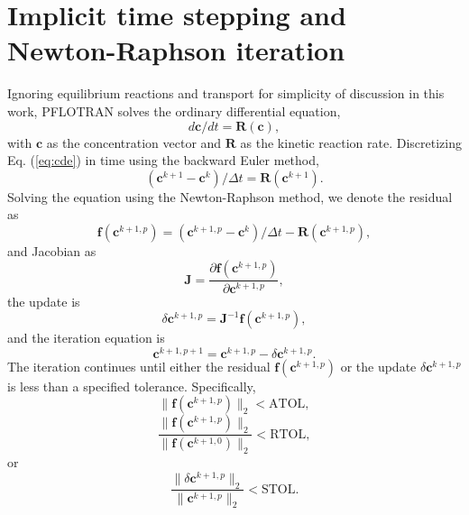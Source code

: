 \documentclass[gmd, manuscript]{copernicus}
\begin{document}
\section{Implicit time stepping and Newton-Raphson iteration}
\label{sec:newton}
Ignoring equilibrium reactions and transport for simplicity of discussion in
this work, PFLOTRAN solves the ordinary differential equation,
\begin{equation}
\label{eq:cde}
{d \mathbf{c}}/{d t} = \mathbf{R}(\mathbf{c}),
\end{equation}
with $\mathbf{c}$ as the concentration vector and $\mathbf{R}$ as the kinetic reaction rate. 
Discretizing Eq. (\ref{eq:cde}) in time using the backward Euler method, 
\begin{equation}
{(\mathbf{c}^{k+1} - \mathbf{c}^k)}/{\Delta t} = \mathbf{R}(\mathbf{c}^{k+1}).
\label{eq:cdedis}
\end{equation}
Solving the equation  using the Newton-Raphson method, we denote the residual as
\begin{equation}
\mathbf{f}(\mathbf{c}^{k+1,p} )=(\mathbf{c}^{k+1,p}-\mathbf{c}^k)/\Delta t-\mathbf{R}(\mathbf{c}^{k+1,p}),
\label{eq:residual}
\end{equation}
and Jacobian as
\begin{equation}
\mathbf{J} = \frac{\partial \mathbf{f}(\mathbf{c}^{k+1,p})}{\partial \mathbf{c}^{k+1,p}},
\label{eq:jacobian}
\end{equation}
the update is
\begin{equation}
\delta \mathbf{c}^{k+1,p}= \mathbf{J}^{-1} \mathbf{f} (\mathbf{c}^{k+1,p}),
\label{eq:axb}
\end{equation}
and the iteration equation is
\begin{equation}
\mathbf{c}^{k+1,p+1}=\mathbf{c}^{k+1,p}-\delta \mathbf{c}^{k+1,p}.
\label{eq:update}
\end{equation}
The iteration continues until either the residual
$\mathbf{f}(\mathbf{c}^{k+1,p} )$ or the update $\delta
\mathbf{c}^{k+1,p}$ is less than a specified tolerance. Specifically,
\begin{equation}
\|\mathbf{f}(\mathbf{c}^{k+1,p} )\|_2 < \text{ATOL},
\label{eq:atol}
\end{equation}
\begin{equation}
\frac{\|\mathbf{f}(\mathbf{c}^{k+1,p} )\|_2}{\|\mathbf{f}(\mathbf{c}^{k+1,0} )\|_2} < \text{RTOL},
\label{eq:rtol}
\end{equation}
or
\begin{equation}
\frac{\|\delta \mathbf{c}^{k+1,p} \|_2}{\|\mathbf{c}^{k+1,p} \|_2} < \text{STOL}.
\label{eq:stol}
\end{equation}
\end{document}

